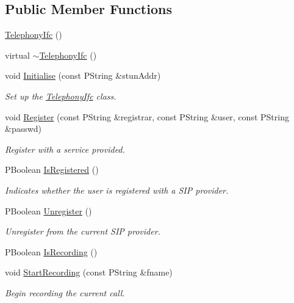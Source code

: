 \subsection*{Public Member Functions}
\begin{CompactItemize}
\item 
\hyperlink{classTelephonyIfc_5c7207e37d5e718cf8bc8e855c5e1fd5}{TelephonyIfc} ()
\item 
virtual \hyperlink{classTelephonyIfc_c8e1d2141874e5aa05c56174605a9e1b}{$\sim$TelephonyIfc} ()
\item 
void \hyperlink{classTelephonyIfc_b63974908141d9dd111af91617276735}{Initialise} (const PString \&stunAddr)
\begin{CompactList}\small\item\em Set up the \hyperlink{classTelephonyIfc}{TelephonyIfc} class. \item\end{CompactList}\item 
void \hyperlink{classTelephonyIfc_ddbfc63168d5e70fd4f83469de4aabb7}{Register} (const PString \&registrar, const PString \&user, const PString \&passwd)
\begin{CompactList}\small\item\em Register with a service provided. \item\end{CompactList}\item 
PBoolean \hyperlink{classTelephonyIfc_20e9a9dd2df97b6c50aa1e19191c890a}{IsRegistered} ()
\begin{CompactList}\small\item\em Indicates whether the user is registered with a SIP provider. \item\end{CompactList}\item 
PBoolean \hyperlink{classTelephonyIfc_957da4a7936c3672a48f0fa93f655676}{Unregister} ()
\begin{CompactList}\small\item\em Unregister from the current SIP provider. \item\end{CompactList}\item 
PBoolean \hyperlink{classTelephonyIfc_4acdd44e7af7967ed53cdf9d47dc0c27}{IsRecording} ()
\item 
void \hyperlink{classTelephonyIfc_2cd8176d99232038fbe8718417135b07}{StartRecording} (const PString \&fname)
\begin{CompactList}\small\item\em Begin recording the current call. \item\end{CompactList}\item 

\end{CompactItemize}
